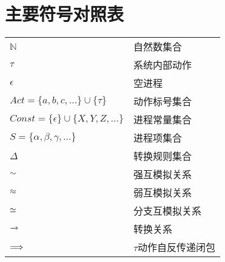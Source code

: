 
\chapter{主要符号对照表}
\label{chap:symb}
\begin{tabular}{ll}

 \hspace{2em}$\mathbb{N}$       & \hspace{5em}自然数集合 \\
 \hspace{2em}$\tau$		& \hspace{5em}系统内部动作\\
 \hspace{2em}$\epsilon$		& \hspace{5em}空进程\\
\hspace{2em}$Act=\{a,b,c,\ldots\}\cup\{\tau\}$ &\hspace{5em}动作标号集合\\
 \hspace{2em}$Const=\{\epsilon\}\cup\{X,Y,Z,\ldots\}$ & \hspace{5em}进程常量集合\\
 \hspace{2em}$S=\{\alpha,\beta,\gamma,\ldots\}$     & \hspace{5em}进程项集合 \\
  \hspace{2em}$\Delta$       & \hspace{5em}转换规则集合 \\
 \hspace{2em}$\sim$ &\hspace{5em}强互模拟关系\\
 \hspace{2em}$\approx$ &\hspace{5em}弱互模拟关系\\
 \hspace{2em}$\simeq$ &\hspace{5em}分支互模拟关系\\
 \hspace{2em}${\xrightarrow{}{}}$ &\hspace{5em}转换关系\\
 \hspace{2em}${\stackrel{}{\Longrightarrow}}$ &\hspace{5em}$\tau$动作自反传递闭包\\

\end{tabular}
